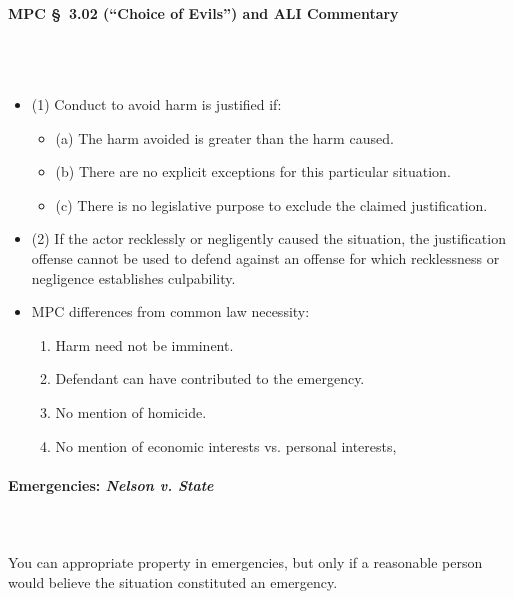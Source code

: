 \paragraph{MPC \S\ 3.02 (``Choice of Evils'') and ALI Commentary}
~\\\\
\begin{itemize}
    \item (1) Conduct to avoid harm is justified if:
    \begin{itemize}
        \item (a) The harm avoided is greater than the harm caused.
        \item (b) There are no explicit exceptions for this particular 
        situation.
        \item (c) There is no legislative purpose to exclude the claimed 
        justification.
    \end{itemize}
    \item (2) If the actor recklessly or negligently caused the situation, the 
    justification offense cannot be used to defend against an offense for 
    which recklessness or negligence establishes culpability.
    \item MPC differences from common law necessity:
    \begin{enumerate}
        \item Harm need not be imminent.
        \item Defendant can have contributed to the emergency.
        \item No mention of homicide.
        \item No mention of economic interests vs. personal interests,
    \end{enumerate}
\end{itemize}



\paragraph{Emergencies: \emph{Nelson v. State}}
~\\\\
You can appropriate property in emergencies, but only if a reasonable person 
would believe the situation constituted an emergency.


